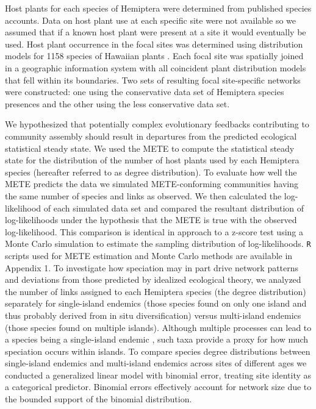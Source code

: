Host plants for each species of Hemiptera were determined from
published species accounts. Data on host plant use at each specific
site were not available so we assumed that if a known host plant were
present at a site it would eventually be used. Host plant occurrence
in the focal sites was determined using distribution models for 1158
species of Hawaiian plants \citep{price2012}. Each focal site was
spatially joined in a geographic information system with all
coincident plant distribution models that fell within its
boundaries. Two sets of resulting focal site-specific networks were
constructed: one using the conservative data set of Hemiptera species
presences and the other using the less conservative data set.

We hypothesized that potentially complex evolutionary feedbacks
contributing to community assembly should result in departures from
the predicted ecological statistical steady state. We used the METE
\citep{williams2010, harte2011} to compute the statistical steady
state for the distribution of the number of host plants used by each
Hemiptera species (hereafter referred to as degree distribution). To
evaluate how well the METE predicts the data we simulated
METE-conforming communities having the same number of species and
links as observed. We then calculated the log-likelihood of each
simulated data set and compared the resultant distribution of
log-likelihoods under the hypothesis that the METE is true with the
observed log-likelihood. This comparison is identical in approach to a
z-score test using a Monte Carlo simulation to estimate the sampling
distribution of log-likelihoods. \texttt{R} scripts
\citep[v.3.1.1;][]{RCore} used for METE estimation and Monte Carlo
methods are available in Appendix 1.  To investigate how speciation
may in part drive network patterns and deviations from those predicted
by idealized ecological theory, we analyzed the number of links
assigned to each Hemiptera species (the degree distribution)
separately for single-island endemics (those species found on only one
island and thus probably derived from in situ diversification) versus
multi-island endemics (those species found on multiple
islands). Although multiple processes can lead to a species being a
single-island endemic \citep{whittaker2008}, such taxa provide a proxy
for how much speciation occurs within islands. To compare species
degree distributions between single-island endemics and multi-island
endemics across sites of different ages we conducted a generalized
linear model with binomial error, treating site identity as a
categorical predictor. Binomial errors effectively account for network
size due to the bounded support of the binomial distribution.

